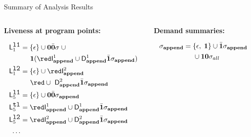 \documentclass[xcolor=x11names,compress,mathserif]{beamer}
\renewcommand{\(}{\begin{columns}}
\renewcommand{\)}{\end{columns}}
\newcommand{\<}[1]{\begin{column}{#1}}
\renewcommand{\>}{\end{column}}
\begin{document}
\begin{frame}[t]{Summary of Analysis Results}
\scriptsize

\begin{columns}[c]
  \begin{column}[T]{0.33\textwidth}
\vspace*{1.5cm}
\centerline{\bf Liveness at program points:}
  \begin{align*}
    \Lanv{1}{\lista} &= \{\epsilon\} \cup  \acar\bcar\sigma\; \cup \\
    &\;\;\;\;\;\acdr({\red \Uf{\append}{1} \cup \Df{\append}{1}\bcdr\sigma_{\append}})\\
    \Lanv{1}{\listb} &= \{\epsilon\} \cup {\red \Uf{\append}{2}}\\
    &\;\;\;\;\;{\red  \cup\  \Df{\append}{2}\bcdr\sigma_{\append}}\\
    \Lanv{5}{\lista} &= \{\epsilon\} \cup  \acar\bcar\sigma_{\append}\\
    \Lanv{5}{\xtl} &= {\red \Uf{\append}{1} \cup \Df{\append}{1}\bcdr\sigma_{\append}}\\
    \Lanv{5}{\listb} &= {\red \Uf{\append}{2} \cup \Df{\append}{2}\bcdr\sigma_{\append}}\\
    \ldots\\
  \end{align*}
  \end{column}
\begin{column}[T]{0.33\textwidth}
\vspace*{1.5cm}
\centerline{\bf Demand summaries:}
     \begin{align*}
       \sigma_{\mathbf{append}} &= \{\epsilon, \; \mathbf{1}\} \cup
       \bar{\mathbf{1}}\sigma_{\mathbf{append}}\\
       & \;\;\;\;\;\cup  \mathbf{1}\mathbf{0}\sigma_{all}
     \end{align*}

\end{column}
\end{columns}
\end{frame}
\end{document}
